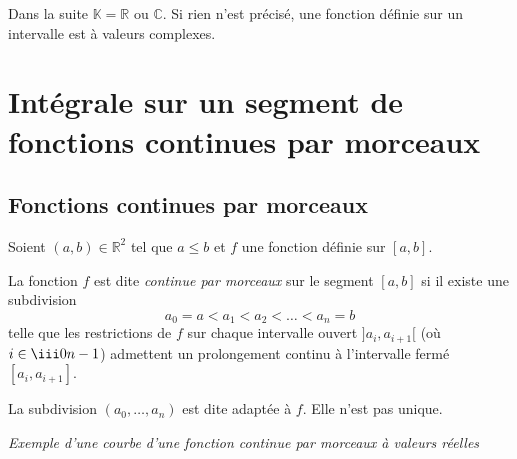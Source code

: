 \documentclass[french,11pt,twoside]{VcCours}
\begin{document}

\tableofcontents
\separationTitre

\newpage
Dans la suite $\mathbb{K}= \mathbb{R}$ ou $\mathbb{C}$. Si rien n'est précisé, une fonction définie sur un intervalle est à valeurs complexes.

\section{Intégrale sur un segment de fonctions continues par morceaux}

\subsection{Fonctions continues par morceaux}

\begin{Definition}{}
Soient $(a,b) \in \mathbb{R}^2$ tel que $a \leq b$ et $f$ une fonction définie sur $[a,b]$.

La fonction $f$ est dite \emph{continue par morceaux} sur le segment $[a,b]$ si il existe une subdivision
\[a_0 = a < a_1 < a_2 < \dots < a_n =b\]
telle que les restrictions de $f$ sur chaque intervalle ouvert $]a_i,a_{i+1}[$ (où $i \in \iii0{n-1}$) admettent un prolongement continu à l'intervalle fermé $[a_i,a_{i+1}]$.
\end{Definition}

\begin{Remarque}{} La subdivision $(a_0, \ldots, a_n)$ est dite adaptée à $f$. Elle n'est pas unique.
\end{Remarque}

\begin{center}
\emph{Exemple d'une courbe d'une fonction continue par morceaux à valeurs réelles}
\end{center}

\begin{center}
\end{center}
\end{document}
